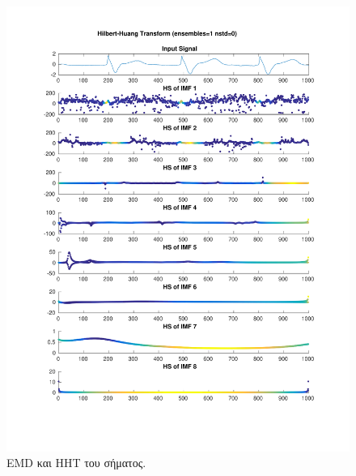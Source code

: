 \documentclass[11pt,a4paper]{article}
\begin{document}
\begin{figure}[H]
\begin{minipage}{0.48\textwidth}
	\includegraphics[width=\textwidth]{fig/217l1_hht.pdf}
\end{minipage}
\vfill
\caption{EMD και HHT του σήματος.}
\label{fig:217l1_hht}
\end{figure}
\end{document}
